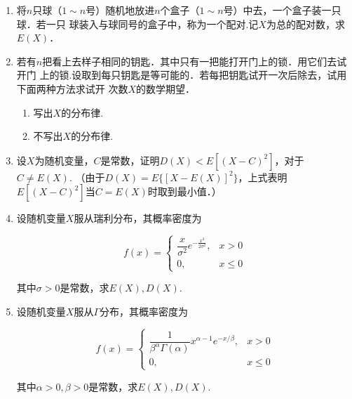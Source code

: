 \documentclass[10pt,a4paper]{article}
\begin{document}
\begin{enumerate}
    \item 将$n$只球（$1\sim n$号）随机地放进$n$个盒子（$1\sim n$号）中去，一个盒子装一只球．若一只
    球装入与球同号的盒子中，称为一个配对.记$X$为总的配对数，求$E(X)$．
    \vspace{10cm}



    \item 若有$n$把看上去样子相同的钥匙．其中只有一把能打开门上的锁．用它们去试开门
    上的锁.设取到每只钥匙是等可能的．若每把钥匙试开一次后除去，试用下面两种方法求试开
    次数$X$的数学期望．
    \begin{enumerate}
        \item 写出$X$的分布律.
        \item 不写出$X$的分布律.
    \end{enumerate}
    \vspace{10cm}


    \item 设$X$为随机变量，$C$是常数，证明$D(X)<E[(X-C)^2]$，对于$C\neq E(X)$.
    （由于$D(X)=E\{[X-E(X)]^2\}$，上式表明$E[(X-C)^2]$当$C=E(X)$时取到最小值．）
    \vspace{10cm}



    \item 设随机变量$X$服从瑞利分布，其概率密度为
    \vspace{-0.5cm}
    \begin{spacing}{2.0}
    $$f(x)=\left\{\begin{array}{ll}
        \dfrac{x}{\sigma^2}e^{-\frac{x^{\scriptscriptstyle 2}}{2\sigma^{\scriptscriptstyle 2}}}, & x>0\\
        0, & x\leq 0
    \end{array}\right.$$
    \end{spacing}
    \vspace{-0.5cm}
    其中$\sigma>0$是常数，求$E(X),D(X)$.
    \vspace{10cm}




    \item 设随机变量$X$服从$\Gamma$分布，其概率密度为
    \vspace{-0.5cm}
    \begin{spacing}{2.0}
    $$f(x)=\left\{\begin{array}{ll}
        \dfrac{1}{\beta^\alpha \Gamma(\alpha)}x^{\alpha-1}e^{-x/\beta}, & x>0\\
        0, & x\leq 0
    \end{array}\right.$$
    \end{spacing}
    \vspace{-0.5cm}
    其中$\alpha>0,\beta>0$是常数，求$E(X),D(X)$.
    \vspace{10cm}





\end{enumerate}
\end{document}
